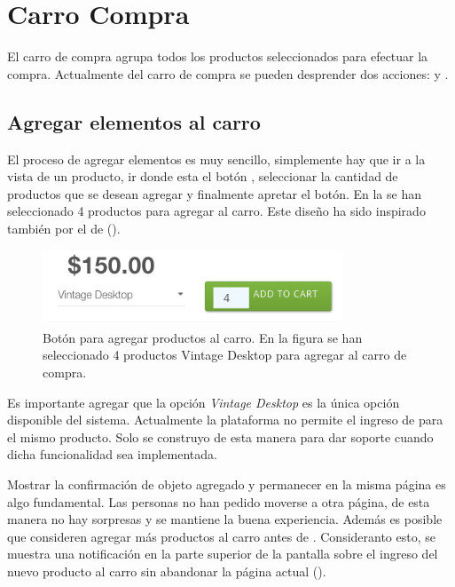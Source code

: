 \section{Carro Compra}
	El carro de compra agrupa todos los productos seleccionados para efectuar la compra. Actualmente del carro de compra se pueden desprender dos acciones:  y .

	\subsection{Agregar elementos al carro}\label{chapter:section:carro_compra:subsection:add}

		El proceso de agregar elementos es muy sencillo, simplemente hay que ir a la vista de un producto, ir donde esta el botón \addtocartLABEL, seleccionar la cantidad de productos que se desean agregar y finalmente apretar el botón. En la  se han seleccionado 4 productos para agregar al carro. Este diseño ha sido inspirado también por el \websiteINT de \shopifyNAME ().

		\begin{figure}[H]
			\centering
			\includegraphics[width=0.8\textwidth]{figuras/productos/details/write/add_to_cart_button.png}
			\caption{Botón para agregar productos al carro. En la figura se han seleccionado 4 productos Vintage Desktop para agregar al carro de compra.}
			\label{figure:solution:cart:button}
		\end{figure}

		Es importante agregar que la opción \textit{Vintage Desktop} es la única opción disponible del sistema. Actualmente la plataforma no permite el ingreso de \VariantsForm para el mismo producto. Solo se construyo de esta manera para dar soporte cuando dicha funcionalidad sea implementada.

		Mostrar la confirmación de objeto agregado y permanecer en la misma página es algo fundamental. Las personas no han pedido moverse a otra página, de esta manera no hay sorpresas y se mantiene la buena experiencia. Además es posible que consideren agregar más productos al carro antes de \checkoutCOM \cite{online_official_conversionxl_checkout_flow}. Consideranto esto, se muestra una notificación en la parte superior de la pantalla sobre el ingreso del nuevo producto al carro sin abandonar la página actual ().

